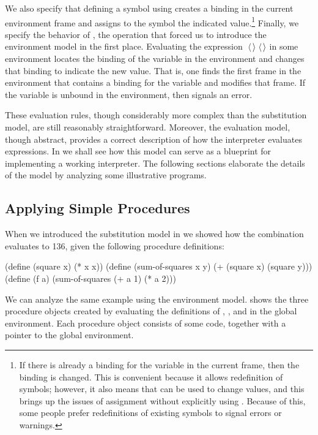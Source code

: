 \noindent
We also specify that defining a symbol using  creates a binding in
the current environment frame and assigns to the symbol the indicated
value.\footnote{If there is already a binding for the variable in the current
frame, then the binding is changed.  This is convenient because it allows
redefinition of symbols; however, it also means that  can be used
to change values, and this brings up the issues of assignment without
explicitly using .  Because of this, some people prefer
redefinitions of existing symbols to signal errors or warnings.} Finally, we
specify the behavior of , the operation that forced us to introduce
the environment model in the first place.  Evaluating the expression
\( \;\langle \)\( \kern0.08em\rangle \)\( \;\langle \)\( \kern0.08em\rangle \)\code{)} in some environment locates the
binding of the variable in the environment and changes that binding to indicate
the new value.  That is, one finds the first frame in the environment that
contains a binding for the variable and modifies that frame.  If the variable
is unbound in the environment, then  signals an error.

These evaluation rules, though considerably more complex than the substitution
model, are still reasonably straightforward.  Moreover, the evaluation model,
though abstract, provides a correct description of how the interpreter
evaluates expressions.  In  we shall see how this model can
serve as a blueprint for implementing a working interpreter.  The following
sections elaborate the details of the model by analyzing some illustrative
programs.

\subsection{Applying Simple Procedures}
\label{Section 3.2.2}

When we introduced the substitution model in  we showed how
the combination  evaluates to 136, given the following procedure
definitions:

\begin{codeBlock}
(define (square x)
  (* x x))
(define (sum-of-squares x y)
  (+ (square x) (square y)))
(define (f a)
  (sum-of-squares (+ a 1) (* a 2)))
\end{codeBlock}

\noindent
We can analyze the same example using the environment model.  
shows the three procedure objects created by evaluating the definitions of
, , and  in the global environment.
Each procedure object consists of some code, together with a pointer to the
global environment.

